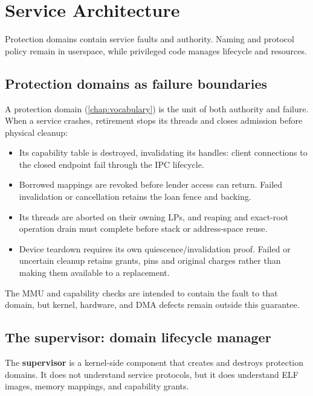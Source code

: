 \chapter{Service Architecture}
\label{chap:service-architecture}

Protection domains contain service faults and authority. Naming and protocol
policy remain in userspace, while privileged code manages lifecycle and resources.

\section{Protection domains as failure boundaries}

A protection domain (\autoref{chap:vocabulary}) is the unit of both authority and failure. When
a service crashes, retirement stops its threads and closes admission before
physical cleanup:

\begin{itemize}
    \item Its capability table is destroyed, invalidating its handles: client
        connections to the closed endpoint fail through the IPC lifecycle.
    \item Borrowed mappings are revoked before lender access can return.
        Failed invalidation or cancellation retains the loan fence and backing.
    \item Its threads are aborted on their owning LPs, and reaping and exact-root
        operation drain must complete before stack or address-space reuse.
    \item Device teardown requires its own quiescence/invalidation proof.
        Failed or uncertain cleanup retains grants, pins and original charges
        rather than making them available to a replacement.
\end{itemize}

The MMU and capability checks are intended to contain the fault to that domain, but
kernel, hardware, and DMA defects remain outside this guarantee.

\section{The supervisor: domain lifecycle manager}

The \textbf{supervisor} is a kernel-side component that creates and destroys
protection domains. It does not understand service protocols, but it does understand
ELF images, memory mappings, and capability grants.

